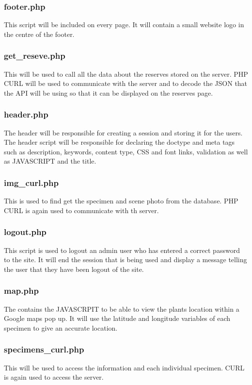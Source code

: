     \subsubsection{footer.php}
        This script will be included on every page. It will contain a small website logo in the centre of the footer. 


    \subsubsection{get\_reseve.php}
        This will be used to call all the data about the reserves stored on the server. PHP CURL will be used to communicate with the server and to decode the JSON that the API will be using so that it can be displayed on the reserves page.

    \subsubsection{header.php}
        The header will be responsible for creating a session and storing it for the users. The header script will be responsible for declaring the doctype and meta tags such as description, keywords, content type, CSS and font links, validation as well as JAVASCRIPT and the title. 

    \subsubsection{img\_curl.php}
        This is used to find get the specimen and scene photo from the database. PHP CURL is again used to communicate with th server.

    \subsubsection{logout.php}
        This script is used to logout an admin user who has entered a correct password to the site. It will end the session that is being used and display a message telling the user that they have been logout of the site.

    \subsubsection{map.php}
        The contains the JAVASCRPIT to be able to view the plants location within a Google maps pop up. It will use the latitude and longitude variables of each specimen to give an accurate location.

    \subsubsection{specimens\_curl.php}
        This will be used to access the information and each individual specimen. CURL is again used to access the server.

